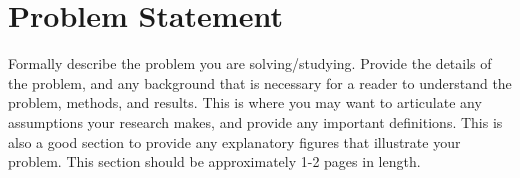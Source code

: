 \section{Problem Statement}

Formally describe the problem you are solving/studying. Provide the details of
the problem, and any background that is necessary for a reader to understand
the problem, methods, and results. This is where you may want to articulate any
assumptions your research makes, and provide any important definitions. This is
also a good section to provide any explanatory figures that illustrate your
problem. This section should be approximately 1-2 pages in length.
